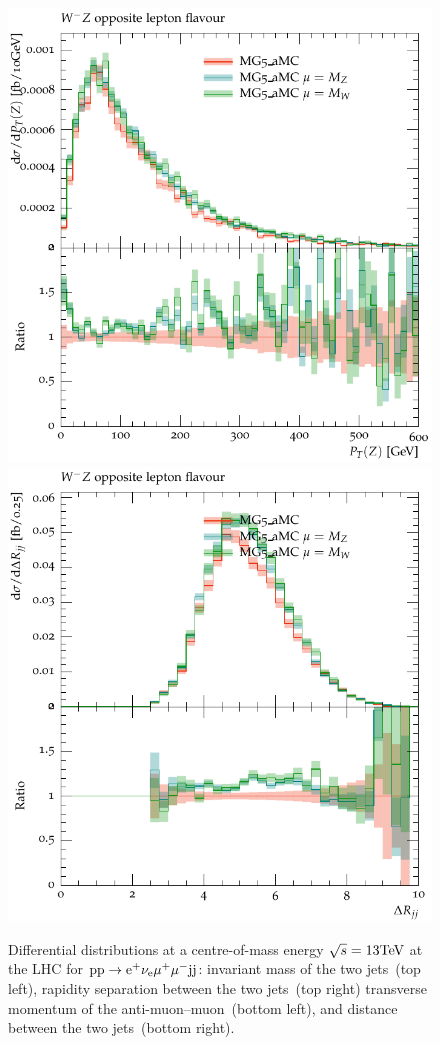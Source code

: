 \documentclass[11pt]{cernrep}
\begin{document}
\begin{figure}[htbp]
\begin{center}
   \includegraphics[scale=0.5]{figs/MG_WmZ_OF_ZPt}
   \includegraphics[scale=0.5]{figs/MG_WmZ_OF_dRjj}
\caption{Differential distributions at a centre-of-mass energy $\sqrt{s}=13{\rm TeV}$ at the LHC for ${\rm p} {\rm p} \to {\rm e}^+  \nu_{\rm e}  \mu^+ \mu^- {\rm j} {\rm j}$: 
                invariant mass of the two jets~(top left),
                rapidity separation between the two jets~(top right)
                transverse momentum of the anti-muon--muon~(bottom left), and
                distance between the two jets~(bottom right).}
\label{vbs_fig_shower_2a}
\end{center}
\end{figure}
\end{document}
